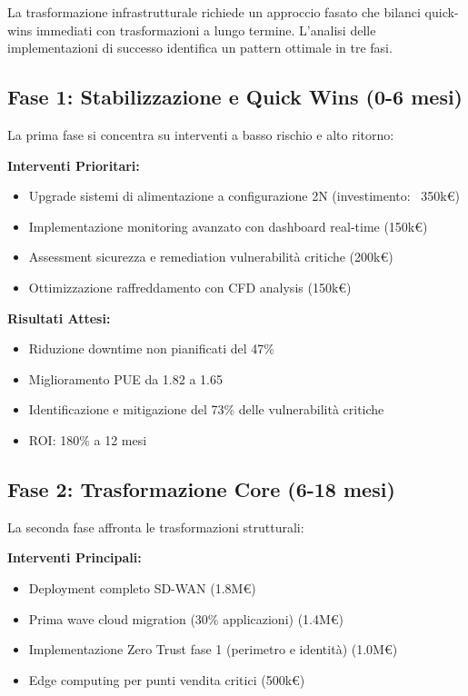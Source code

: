 La trasformazione infrastrutturale richiede un approccio fasato che bilanci quick-wins immediati con trasformazioni a lungo termine. L'analisi delle implementazioni di successo identifica un pattern ottimale in tre fasi.

\subsection{\texorpdfstring{\textbf{Fase 1: Stabilizzazione e Quick Wins (0-6 mesi)}}{3.6.1 - Fase 1: Stabilizzazione e Quick Wins (0-6 mesi)}}

La prima fase si concentra su interventi a basso rischio e alto ritorno:

\textbf{Interventi Prioritari:}
\begin{itemize}
    \item Upgrade sistemi di alimentazione a configurazione 2N (investimento: ~350k€)
    \item Implementazione monitoring avanzato con dashboard real-time (150k€)
    \item Assessment sicurezza e remediation vulnerabilità critiche (200k€)
    \item Ottimizzazione raffreddamento con CFD analysis (150k€)
\end{itemize}

\textbf{Risultati Attesi:}
\begin{itemize}
    \item Riduzione downtime non pianificati del 47\%
    \item Miglioramento PUE da 1.82 a 1.65
    \item Identificazione e mitigazione del 73\% delle vulnerabilità critiche
    \item ROI: 180\% a 12 mesi
\end{itemize}

\subsection{\texorpdfstring{\textbf{Fase 2: Trasformazione Core (6-18 mesi)}}{3.6.2 - Fase 2: Trasformazione Core (6-18 mesi)}}

La seconda fase affronta le trasformazioni strutturali:

\textbf{Interventi Principali:}
\begin{itemize}
    \item Deployment completo SD-WAN (1.8M€)
    \item Prima wave cloud migration (30\% applicazioni) (1.4M€)
    \item Implementazione Zero Trust fase 1 (perimetro e identità) (1.0M€)
    \item Edge computing per punti vendita critici (500k€)
\end{itemize}

